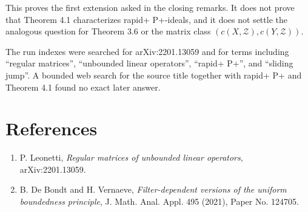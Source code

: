 \documentclass[11pt]{article}
\begin{document}
This proves the first extension asked in the closing remarks. It does not prove
that Theorem 4.1 characterizes rapid+ P+-ideals, and it does not settle the
analogous question for Theorem 3.6 or the matrix class
$(c(X,\mathcal Z),c(Y,\mathcal Z))$.

The run indexes were searched for arXiv:2201.13059 and for terms including
``regular matrices'', ``unbounded linear operators'', ``rapid+ P+'', and
``sliding jump''. A bounded web search for the source title together with
rapid+ P+ and Theorem 4.1 found no exact later answer.

\section*{References}

\begin{enumerate}
\item P. Leonetti, \emph{Regular matrices of unbounded linear operators},
arXiv:2201.13059.
\item B. De Bondt and H. Vernaeve, \emph{Filter-dependent versions of the
uniform boundedness principle}, J. Math. Anal. Appl. 495 (2021), Paper
No. 124705.
\end{enumerate}
\end{document}
